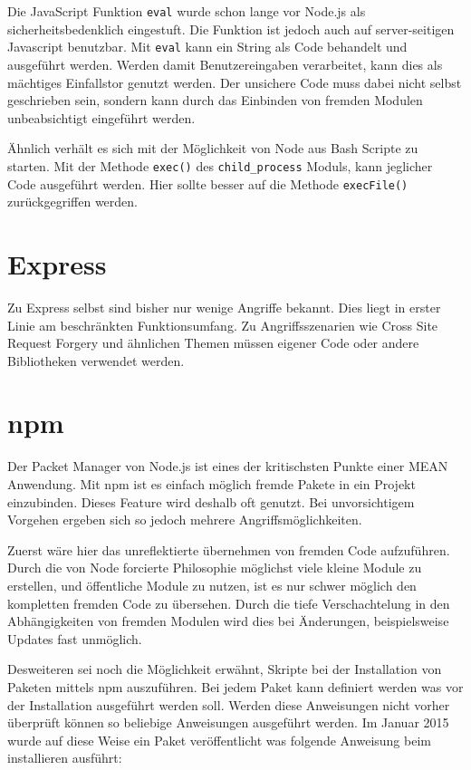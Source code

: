 Die JavaScript Funktion \texttt{eval} wurde schon lange vor Node.js als
sicherheitsbedenklich eingestuft. Die Funktion ist jedoch auch auf
server-seitigen Javascript benutzbar. Mit \texttt{eval} kann ein String als
Code behandelt und ausgeführt werden. Werden damit Benutzereingaben
verarbeitet, kann dies als mächtiges Einfallstor genutzt werden. Der
unsichere Code muss dabei nicht selbst geschrieben sein, sondern kann
durch das Einbinden von fremden Modulen unbeabsichtigt eingeführt
werden.

Ähnlich verhält es sich mit der Möglichkeit von Node aus Bash Scripte zu
starten. Mit der Methode \texttt{exec()} des \texttt{child\_process} Moduls, kann
jeglicher Code ausgeführt werden. Hier sollte besser auf die Methode
\texttt{execFile()} zurückgegriffen werden.

\section{Express}\label{express}

Zu Express selbst sind bisher nur wenige Angriffe bekannt. Dies liegt in
erster Linie am beschränkten Funktionsumfang. Zu Angriffsszenarien wie
Cross Site Request Forgery und ähnlichen Themen müssen eigener Code oder
andere Bibliotheken verwendet werden.

\section{npm}\label{npm}

Der Packet Manager von Node.js ist eines der kritischsten Punkte einer
MEAN Anwendung. Mit npm ist es einfach möglich fremde Pakete in ein
Projekt einzubinden. Dieses Feature wird deshalb oft genutzt. Bei
unvorsichtigem Vorgehen ergeben sich so jedoch mehrere
Angriffsmöglichkeiten.

Zuerst wäre hier das unreflektierte übernehmen von fremden Code
aufzuführen. Durch die von Node forcierte Philosophie möglichst viele
kleine Module zu erstellen, und öffentliche Module zu nutzen, ist es nur
schwer möglich den kompletten fremden Code zu übersehen. Durch die tiefe
Verschachtelung in den Abhängigkeiten von fremden Modulen wird dies bei
Änderungen, beispielsweise Updates fast unmöglich.

Desweiteren sei noch die Möglichkeit erwähnt, Skripte bei der Installation
von Paketen mittels npm auszuführen. Bei jedem Paket kann definiert
werden was vor der Installation ausgeführt werden soll. Werden diese
Anweisungen nicht vorher überprüft können so beliebige Anweisungen
ausgeführt werden. Im Januar 2015\cite{security-npm}
wurde auf diese Weise ein Paket veröffentlicht was folgende Anweisung
beim installieren ausführt:

